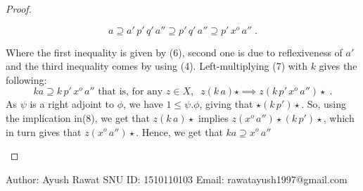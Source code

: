 \documentclass[a4paper]{article}
\theoremstyle{definition}
\begin{document}
\begin{proof}
\begin{enumerate}[label=(\roman*)]
					\begin{equation}
						a\supseteq a'\,p'\,q'\,a'' \supseteq p'\,q'\,a''
						\supseteq p' \,x^o \,a'' \; .
					\end{equation}

					Where the first inequality is given by (6), second one
					is due to reflexiveness	of $a'$ and the third inequality comes by using (4).
					Left-multiplying (7) with $k$ gives the following:
					\begin{equation}
						ka \supseteq k\,p'\,x^o\,a'' \text{ that is, for any } z\in X,
						\; \; z (k\, a) \star \implies z ( k\,p'\,x^o\,a'') \star \; .
					\end{equation}
					As $\psi$ is a right adjoint to $\phi$, we have $1\leq \psi.\phi$, giving that
					$\star (k \, p' )\star $. So, using the implication in(8), we get that
					$z(k\, a) \star $ implies $z ( x^o\,a'') \star (k\,p') \star$, which in turn
					gives that $z(x^o \, a'')\star$. Hence, we get that $ka \supseteq x^o\, a''$
					\qedhere
			\end{enumerate}
		\end{proof}
\nocite{Leinster_2014}
		\printbibliography

		\vfill

		\begin{center}
			Author: Ayush Rawat \hfill SNU ID: 1510110103 \hfill Email: rawatayush1997@gmail.com
		\end{center}
		
\end{document}
